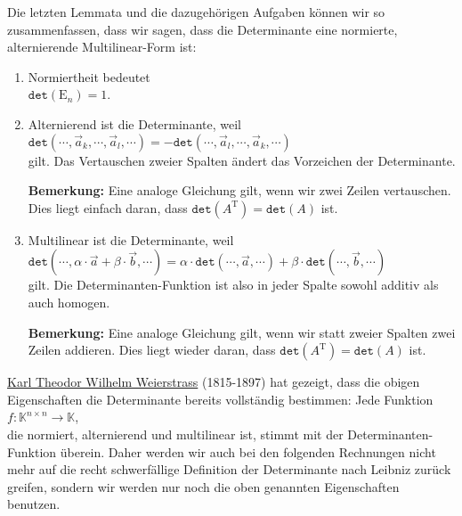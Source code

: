 \remark
Die letzten Lemmata und die dazugeh\"origen Aufgaben k\"onnen wir so zusammenfassen, dass wir sagen, dass
die Determinante eine normierte, alternierende Multilinear-Form ist:
\begin{enumerate}
\item Normiertheit bedeutet
      \\[0.2cm]
      \hspace*{1.3cm}
      $\mathtt{det}(\mathrm{E}_n) = 1$.
\item Alternierend ist die Determinante, weil
      \\[0.2cm]
      \hspace*{1.3cm}
      $\mathtt{det}(\cdots, \vec{a}_ k, \cdots, \vec{a}_l, \cdots) = -\mathtt{det}(\cdots, \vec{a}_l, \cdots, \vec{a}_k, \cdots)$
      \\[0.2cm]
      gilt.  Das Vertauschen zweier Spalten \"andert das Vorzeichen der Determinante.  

      \textbf{Bemerkung:} 
      Eine analoge Gleichung gilt, wenn wir zwei Zeilen vertauschen.  Dies liegt einfach daran,
      dass $\mathtt{det}(A^\mathrm{T}) = \mathtt{det}(A)$ ist.
\item Multilinear ist die Determinante, weil
      \\[0.2cm]
      \hspace*{1.3cm}
      $\mathtt{det}(\cdots, \alpha \cdot \vec{a} + \beta \cdot \vec{b}, \cdots) = 
         \alpha \cdot \mathtt{det}(\cdots, \vec{a}, \cdots) +
         \beta  \cdot \mathtt{det}(\cdots, \vec{b}, \cdots)
      $
      \\[0.2cm]
      gilt.  Die Determinanten-Funktion ist also in jeder Spalte sowohl additiv als auch homogen.

      \textbf{Bemerkung:} 
      Eine analoge Gleichung gilt, wenn wir statt zweier Spalten zwei Zeilen addieren.
      Dies liegt wieder daran, dass $\mathtt{det}(A^\mathrm{T}) = \mathtt{det}(A)$ ist.
\end{enumerate}
\href{http://en.wikipedia.org/wiki/Karl_Weierstrass}{Karl Theodor Wilhelm Weierstrass} (1815-1897)
hat gezeigt, dass die obigen Eigenschaften die Determinante bereits vollst\"andig bestimmen: Jede Funktion
\\[0.2cm]
\hspace*{1.3cm}
$f: \mathbb{K}^{n \times n} \rightarrow \mathbb{K}$,
\\[0.2cm]
die normiert, alternierend und multilinear ist, stimmt mit der Determinanten-Funktion \"uberein.  
Daher werden wir auch bei den folgenden Rechnungen nicht mehr auf die recht schwerf\"allige Definition
der Determinante nach Leibniz zur\"uck greifen, sondern wir werden nur noch die oben genannten
Eigenschaften benutzen.
\eoxs

